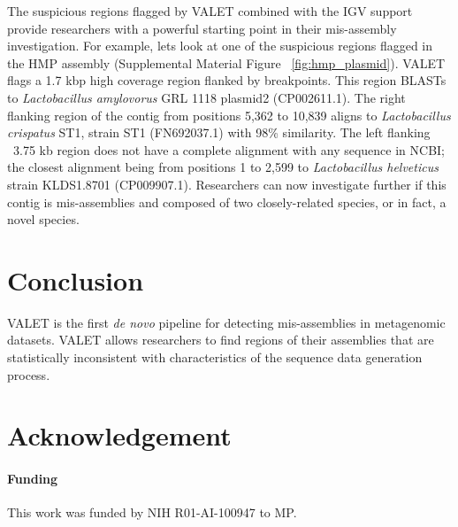 \documentclass{bioinfo}
\begin{document}
The suspicious regions flagged by VALET combined with the IGV support provide researchers with a powerful starting point in their mis-assembly investigation.
For example, lets look at one of the suspicious regions flagged in the HMP assembly (Supplemental Material Figure ~\ref{fig:hmp_plasmid}).
VALET flags a 1.7 kbp high coverage region flanked by breakpoints.
This region BLASTs~\citep{BLAST} to \emph{Lactobacillus amylovorus} GRL 1118 plasmid2 (CP002611.1).
The right flanking region of the contig from positions 5,362 to 10,839 aligns to \emph{Lactobacillus crispatus} ST1, strain ST1 (FN692037.1) with 98\% similarity.
The left flanking ~3.75 kb region does not have a complete alignment with any sequence in NCBI; the closest alignment being from positions 1 to 2,599 to \emph{Lactobacillus helveticus} strain KLDS1.8701 (CP009907.1).
Researchers can now investigate further if this contig is mis-assemblies and composed of two closely-related species, or in fact, a novel species.

\section{Conclusion}

VALET is the first \emph{de novo} pipeline for detecting mis-assemblies in metagenomic datasets.
VALET allows researchers to find regions of their assemblies that are statistically inconsistent with characteristics of the sequence data generation process.


\section*{Acknowledgement}

\paragraph{Funding\textcolon} 
This work was funded by NIH R01-AI-100947 to MP.


% 
% 
% 
% 

% 


\end{document}
